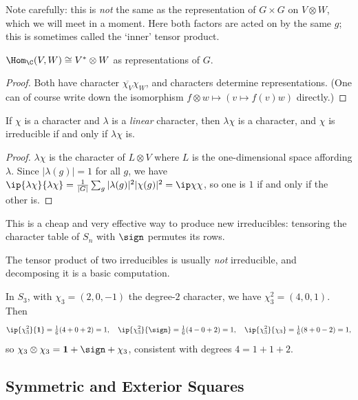 \begin{remark}
	Note carefully: this is \emph{not} the same as the representation of $G\times G$ on $V\otimes W$, which we will meet in a moment. Here both factors are acted on by the same $g$; this is sometimes called the `inner' tensor product.
\end{remark}

\begin{corollary}
	$\Hom_\C(V,W) \cong V^*\otimes W$ as representations of $G$.
\end{corollary}
\begin{proof}
	Both have character $\overline{\chi_V}\chi_W$, and characters determine representations. (One can of course write down the isomorphism $f\otimes w\mapsto (v\mapsto f(v)w)$ directly.)
\end{proof}

\begin{proposition}
	If $\chi$ is a character and $\lambda$ is a \emph{linear} character, then $\lambda\chi$ is a character, and $\chi$ is irreducible if and only if $\lambda\chi$ is.
\end{proposition}
\begin{proof}
	$\lambda\chi$ is the character of $L\otimes V$ where $L$ is the one-dimensional space affording $\lambda$. Since $|\lambda(g)| = 1$ for all $g$, we have $\ip{\lambda\chi}{\lambda\chi} = \frac1{|G|}\sum_g|\lambda(g)|^2|\chi(g)|^2 = \ip\chi\chi$, so one is $1$ if and only if the other is.
\end{proof}

This is a cheap and very effective way to produce new irreducibles: tensoring the character table of $S_n$ with $\sign$ permutes its rows.

The tensor product of two irreducibles is usually \emph{not} irreducible, and decomposing it is a basic computation.

\begin{example}
	In $S_3$, with $\chi_3 = (2,0,-1)$ the degree-$2$ character, we have $\chi_3^2 = (4,0,1)$. Then
	$$\ip{\chi_3^2}{\mathbf 1} = \tfrac16(4 + 0 + 2) = 1, \quad \ip{\chi_3^2}{\sign} = \tfrac16(4 - 0 + 2) = 1, \quad \ip{\chi_3^2}{\chi_3} = \tfrac16(8 + 0 - 2) = 1,$$
	so $\chi_3\otimes\chi_3 = \mathbf 1 + \sign + \chi_3$, consistent with degrees $4 = 1+1+2$.
\end{example}

\subsection{Symmetric and Exterior Squares}

